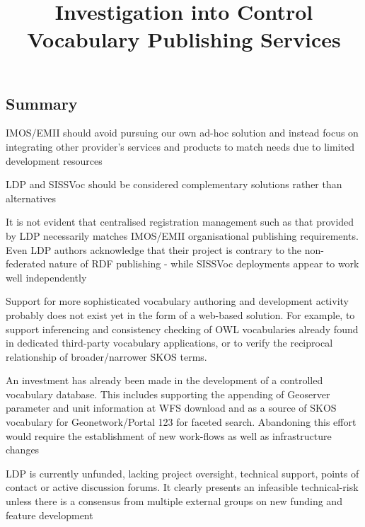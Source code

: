 \documentclass[10pt,a4paper]{article}
\title{Investigation into Control Vocabulary Publishing Services}
\date{}
\newenvironment{italicquotes}
{\begin{quote}\itshape}
{\end{quote}}
\let\Item\item
\newcommand\SpecialItem{\renewcommand\item[1][]{\Item[\textbullet~\bfseries##1]}}
\begin{document}
\SpecialItem

  \maketitle
    \begin{flushleft}



% 
% 



\section{
	Summary
}

\item[] IMOS/EMII should avoid pursuing our own ad-hoc solution and instead 
focus on integrating other provider's services and products to match needs due 
to limited development resources
\item[] LDP and SISSVoc should be considered complementary solutions rather than alternatives
\item[] It is not evident that centralised registration management such as 
that provided by LDP necessarily matches IMOS/EMII organisational publishing 
requirements. Even LDP authors acknowledge that their project is contrary to the 
non-federated nature of RDF publishing - while SISSVoc deployments appear to work
well independently  

\item[] Support for more sophisticated vocabulary authoring and development 
activity probably does not exist yet in the form of a web-based solution. For 
example, to support inferencing and consistency checking of OWL vocabularies already 
found in dedicated third-party vocabulary applications, or to verify the 
reciprocal relationship of broader/narrower SKOS terms.
\item[] An investment has already been made in the development of a controlled vocabulary 
database. This includes supporting the appending of Geoserver parameter and 
unit information at WFS download and 
as a source of SKOS vocabulary for Geonetwork/Portal 123 for faceted search. 
Abandoning this effort would require the establishment of new work-flows as well as infrastructure
changes
\item[] LDP is currently unfunded, lacking project oversight, technical 
support, points of contact or active discussion forums. It clearly presents an infeasible technical-risk 
unless there is a consensus from multiple external groups on new funding and 
feature development 



\end{flushleft}
\end{document}

